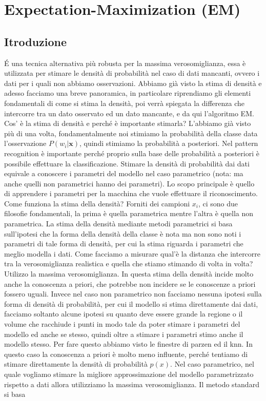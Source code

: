 %
%
%

\chapter{Expectation-Maximization (EM)}
\section{Itroduzione}
\'E una tecnica alternativa più robusta per la massima verosomiglianza, essa è utilizzata per stimare le densità di probabilità nel caso di dati mancanti, ovvero i dati per i quali non abbiamo osservazioni. Abbiamo già visto la stima di densità e adesso facciamo una breve panoramica, in particolare riprendiamo gli elementi fondamentali di come si stima la densità, poi verrà spiegata la differenza che intercorre tra un dato osservato ed un dato mancante, e da qui l'algoritmo EM. Cos' è la stima di densità e perché è importante stimarla? L'abbiamo già visto più di una volta, fondamentalmente noi stimiamo la probabilità della classe data l'osservazione $P(w_i | \mathbf{x})$, quindi stimiamo la probabilità a posteriori. Nel pattern recognition è importante perché proprio sulla base delle probabilità a posteriori è possibile effettuare la classificazione. Stimare la densità di probabilità dai dati equivale a conoscere i parametri del modello nel caso parametrico (nota: ma anche quelli non parametrici hanno dei parametri). Lo scopo principale è quello di apprendere i parametri per la macchina che vuole effettuare il riconoscimento. Come funziona la stima della densità? Forniti dei campioni $x_i$, ci sono due filosofie fondamentali, la prima è quella parametrica mentre l'altra è quella non parametrica. La stima della densità mediante metodi parametrici si basa sull'ipotesi che la forma della densità della classe è nota ma non sono noti i parametri di tale forma di densità, per cui la stima riguarda i parametri che meglio modella i dati. Come facciamo a misurare qual'è la distanza che intercorre tra la verosomiglianza realistica e quella che stiamo stimando di volta in volta? Utilizzo la massima verosomiglianza. In questa stima della densità incide molto anche la conoscenza a priori, che potrebbe non incidere se le conoscenze a priori fossero uguali. Invece nel caso non parametrico non facciamo nessuna ipotesi sulla forma di densità di probabilità, per cui il modello si stima direttamente dai dati, facciamo soltanto alcune ipotesi su quanto deve essere grande la regione o il volume che racchiude i punti in modo tale da poter stimare i parametri del modello ed anche se stesso, quindi oltre a stimare i parametri stimo anche il modello stesso. Per fare questo abbiamo visto le finestre di parzen ed il knn. In questo caso la conoscenza a priori è molto meno influente, perché tentiamo di stimare direttamente la densità di probabilità $p(x)$. Nel caso parametrico, nel quale vogliamo stimare la migliore approssimazione del modello parametrizzato rispetto a dati allora utilizziamo la massima verosomiglianza. Il metodo standard si basa 